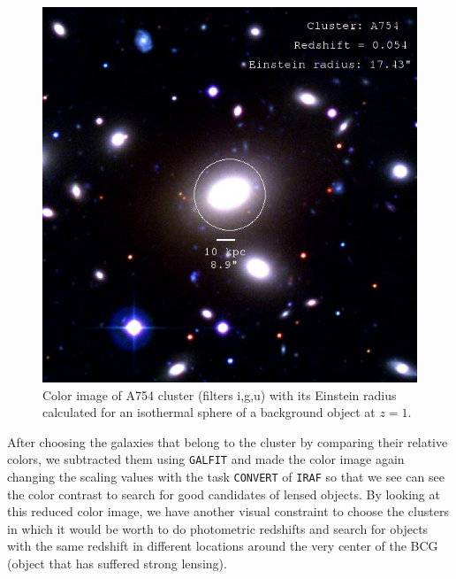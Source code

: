 \begin{figure}[H]
\centering
\includegraphics[width=12cm]{images/cA754.jpg}
\caption[Color image of A754]{Color image of A754 cluster (filters i,g,u) with its Einstein radius calculated for an isothermal sphere of a background object at $z=1$.}
\end{figure}

After choosing the galaxies that belong to the cluster by comparing their relative colors, we subtracted them using \texttt{GALFIT} and made the color image again changing the scaling values with the task \texttt{CONVERT} of \texttt{IRAF} so that we see can see the color contrast to search for good candidates of lensed objects. By looking at this reduced color image, we have another visual constraint to choose the clusters in which it would be worth to do photometric redshifts and search for objects with the same redshift in different locations around the very center of the BCG (object that has suffered strong lensing). 

